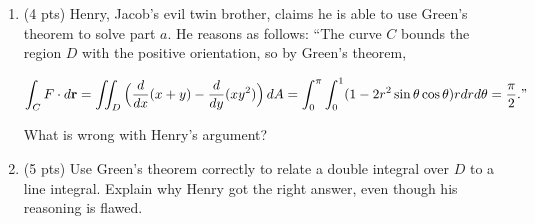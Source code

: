 \documentclass[12 pt]{report}
\begin{document}
\begin{enumerate}
\begin{enumerate}
\vspace{7cm}

\item (4 pts) Henry, Jacob's evil twin brother, claims he is able to use Green's theorem to solve part $a$. He reasons as follows: ``The curve $C$ bounds the region $D$ with the positive orientation, so by Green's theorem, 

$$\int_C F \cdot d\bold{r} = \iint_D \Big(\frac{d}{dx}(x+y) - \frac{d}{dy}(xy^2) \Big) \, dA = \int_0^\pi \int_0^1 (1-2r^2 \sin\theta \cos\theta) r dr d\theta = \frac{\pi}{2}."$$

What is wrong with Henry's argument?   

\vspace{3cm} 

\item (5 pts) Use Green's theorem correctly to relate a double integral over $D$ to a line integral. Explain why Henry got the right answer, even though his reasoning is flawed. 



\end{enumerate} 


\end{enumerate}
\end{document}
